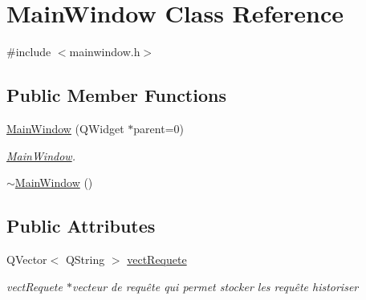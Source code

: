 \hypertarget{class_main_window}{\section{Main\-Window Class Reference}
\label{class_main_window}
}


{\ttfamily \#include $<$mainwindow.\-h$>$}

\subsection*{Public Member Functions}
\begin{DoxyCompactItemize}
\item 
\hyperlink{class_main_window_a8b244be8b7b7db1b08de2a2acb9409db}{Main\-Window} (Q\-Widget $\ast$parent=0)
\begin{DoxyCompactList}\small\item\em \hyperlink{class_main_window}{Main\-Window}. \end{DoxyCompactList}\item 
\hyperlink{class_main_window_ae98d00a93bc118200eeef9f9bba1dba7}{$\sim$\-Main\-Window} ()
\end{DoxyCompactItemize}
\subsection*{Public Attributes}
\begin{DoxyCompactItemize}
\item 
Q\-Vector$<$ Q\-String $>$ \hyperlink{class_main_window_a5f49a678546840890fce99215d0d086c}{vect\-Requete}
\begin{DoxyCompactList}\small\item\em vect\-Requete $\ast$vecteur de requête qui permet stocker les requête historiser \end{DoxyCompactList}\end{DoxyCompactItemize}

